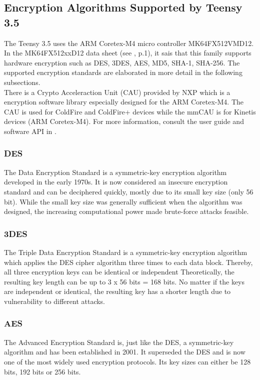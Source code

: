\subsection{Encryption Algorithms Supported by Teensy 3.5}%
The Teensy 3.5 uses the ARM Coretex-M4 micro controller MK64FX512VMD12. In the MK64FX512xxD12 data sheet (see \cite{NXP_Datasheet}, p.1), it sais that this family supports hardware encryption such as DES, 3DES, AES, MD5, SHA-1, SHA-256. The supported encryption standards are elaborated in more detail in the following subsections.\\
There is a Crypto Acceleraction Unit (CAU) provided by NXP which is a encryption software library especially designed for the ARM Coretex-M4. The CAU is used for ColdFire and ColdFire+ devices while the mmCAU is for Kinetis devices (ARM Coretex-M4). For more information, consult the user guide and software API in \cite{CAU_UserGuide}.\\
%
%
\subsubsection{DES}
The Data Encryption Standard is a symmetric-key encryption algorithm developed in the early 1970s. It is now considered an insecure encryption standard and can be deciphered quickly, mostly due to its small key size (only 56 bit). \cite{DES_Wikipedia} While the small key size was generally sufficient when the algorithm was designed, the increasing computational power made brute-force attacks feasible. \cite{3DES_Wikipedia}
%
%
\subsubsection{3DES}
The Triple Data Encryption Standard is a symmetric-key encryption algorithm which applies the DES cipher algorithm three times to each data block. Thereby, all three encryption keys can be identical or independent Theoretically, the resulting key length can be up to 3 x 56 bits = 168 bits. No matter if the keys are independent or identical, the resulting key has a shorter length due to vulnerability to different attacks. \cite{3DES_Wikipedia}
%
%
\subsubsection{AES}
The Advanced Encryption Standard is, just like the DES, a symmetric-key algorithm and has been established in 2001. It superseded the DES and is now one of the most widely used encryption protocols. Its key sizes can either be 128 bits, 192 bits or 256 bits. \cite{AES_Wikipedia}
%
%
